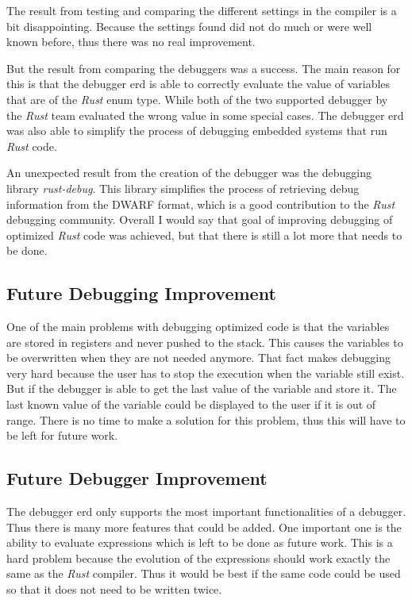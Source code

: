 
The result from testing and comparing the different settings in the compiler is a bit disappointing.
Because the settings found did not do much or were well known before, thus there was no real improvement.


But the result from comparing the debuggers was a success.
The main reason for this is that the debugger \gls{erd} is able to correctly evaluate the value of variables that are of the \emph{Rust} enum type.
While both of the two supported debugger by the \emph{Rust} team evaluated the wrong value in some special cases.
The debugger \gls{erd} was also able to simplify the process of debugging embedded systems that run \emph{Rust} code.


An unexpected result from the creation of the debugger was the debugging library \emph{rust-debug}.
This library simplifies the process of retrieving debug information from the \gls{DWARF} format, which is a good contribution to the \emph{Rust} debugging community.
Overall I would say that goal of improving debugging of optimized \emph{Rust} code was achieved, but that there is still a lot more that needs to be done.


\subsection{Future Debugging Improvement}
One of the main problems with debugging optimized code is that the variables are stored in registers and never pushed to the stack.
This causes the variables to be overwritten when they are not needed anymore.
That fact makes debugging very hard because the user has to stop the execution when the variable still exist.
But if the debugger is able to get the last value of the variable and store it.
The last known value of the variable could be displayed to the user if it is out of range.
There is no time to make a solution for this problem, thus this will have to be left for future work.


\subsection{Future Debugger Improvement}
The debugger \gls{erd} only supports the most important functionalities of a debugger.
Thus there is many more features that could be added.
One important one is the ability to evaluate expressions which is left to be done as future work.
This is a hard problem because the evolution of the expressions should work exactly the same as the \emph{Rust} compiler.
Thus it would be best if the same code could be used so that it does not need to be written twice.


